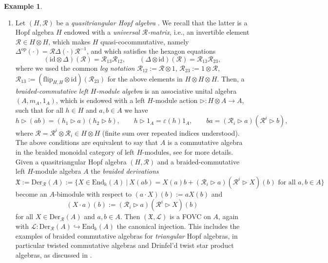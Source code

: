 \documentclass{article}
\theoremstyle{definition}
\newtheorem{example}[thm]{Example}
\begin{document}
\begin{example}
\begin{enumerate}
			\item[ii.)] 
			Let $(H,\mathcal{R})$ be a \textit{quasitriangular Hopf algebra} \cite{Drin}. We recall that the latter is a Hopf algebra $H$ endowed with a \textit{universal $\mathcal{R}$-matrix}, i.e., an invertible element $\mathcal{R}\in H\otimes H$, which makes $H$ quasi-cocommutative, namely $\Delta^\mathrm{op}(\cdot)=\mathcal{R}\Delta(\cdot)\mathcal{R}^{-1}$, and which satisfies the hexagon equations
			\begin{equation}
				(\mathrm{id}\otimes\Delta)(\mathcal{R})=\mathcal{R}_{13}\mathcal{R}_{12},\qquad
				(\Delta\otimes\mathrm{id})(\mathcal{R})=\mathcal{R}_{13}\mathcal{R}_{23},
			\end{equation}
			where we used the common \textit{leg notation} $\mathcal{R}_{12}:=\mathcal{R}\otimes 1$, $\mathcal{R}_{23}:=1\otimes\mathcal{R}$, $\mathcal{R}_{13}:=(\mathrm{flip}_{H,H}\otimes\mathrm{id})(\mathcal{R}_{23})$ for the above elements in $H\otimes H\otimes H$. Then, a \textit{braided-commutative left $H$-module algebra} is an associative unital algebra $(A,m_A,1_A)$, which is endowed with a left $H$-module action $\rhd\colon H\otimes A\to A$, such that for all $h\in H$ and $a,b\in A$ we have 
			\begin{equation}
				h\rhd(ab)=(h_1\rhd a)(h_2\rhd b),\qquad
				h\rhd 1_A=\varepsilon(h)1_A,\qquad
				ba=(\mathcal{R}_i\rhd a)(\mathcal{R}^i\rhd b),
			\end{equation}
			where $\mathcal{R}=\mathcal{R}^i\otimes\mathcal{R}_i\in H\otimes H$ (finite sum over repeated indices understood). The above conditions are equivalent to say that $A$ is a commutative algebra in the braided monoidal category of left $H$-modules, see \cite[Theorem 9.2.4]{MajFound} for more details.
			Given a quasitriangular Hopf algebra $(H,\mathcal{R})$ and a braided-commutative left $H$-module algebra $A$ the \textit{braided derivations}
			$$
			\mathfrak{X}:=\mathrm{Der}_\mathcal{R}(A):=\{X\in\mathrm{End}_\Bbbk(A)~|~X(ab)=X(a)b+(\mathcal{R}_i\rhd a)(\mathcal{R}^i\rhd X)(b)\text{ for all }a,b\in A\}
			$$
			become an $A$-bimodule with respect to $(a\cdot X)(b):=aX(b)$ and
			$$
			(X\cdot a)(b):=(\mathcal{R}_i\rhd a)(\mathcal{R}^i\rhd X)(b)
			$$
			for all $X\in\mathrm{Der}_\mathcal{R}(A)$ and $a,b\in A$. Then $(\mathfrak{X},\mathscr{L})$ is a FOVC on $A$, again with $\mathscr{L}\colon\mathrm{Der}_\mathcal{R}(A)\hookrightarrow\mathrm{End}_\Bbbk(A)$ the canonical injection.
			This includes the examples of braided commutative algebras for \textit{triangular} Hopf algebras, in particular twisted commutative algebras and Drinfel'd twist star product algebras, as discussed in \cite{WeBC,WeThesis}.

\end{enumerate}
\end{example}
\end{document}
